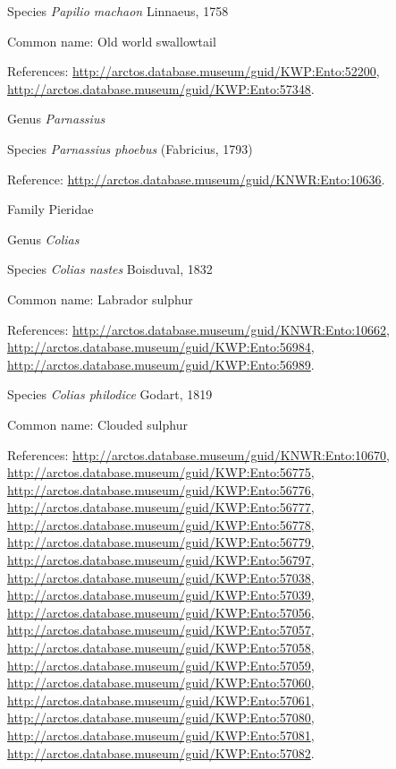 \documentclass[9pt, article]{memoir}
\begin{document}
\begin{multicols}{2}
\vspace{6pt}\noindent\hspace{36pt}Species \textit{Papilio machaon} Linnaeus, 1758


Common name: Old world swallowtail

References: 
\url{http://arctos.database.museum/guid/KWP:Ento:52200}, 
\url{http://arctos.database.museum/guid/KWP:Ento:57348}.

\vspace{6pt}\noindent\hspace{30pt}Genus \textit{Parnassius}


\vspace{6pt}\noindent\hspace{36pt}Species \textit{Parnassius phoebus} (Fabricius, 1793)


Reference: 
\url{http://arctos.database.museum/guid/KNWR:Ento:10636}.

\vspace{6pt}\noindent\hspace{24pt}Family Pieridae


\vspace{6pt}\noindent\hspace{30pt}Genus \textit{Colias}


\vspace{6pt}\noindent\hspace{36pt}Species \textit{Colias nastes} Boisduval, 1832


Common name: Labrador sulphur

References: 
\url{http://arctos.database.museum/guid/KNWR:Ento:10662}, 
\url{http://arctos.database.museum/guid/KWP:Ento:56984}, 
\url{http://arctos.database.museum/guid/KWP:Ento:56989}.

\vspace{6pt}\noindent\hspace{36pt}Species \textit{Colias philodice} Godart, 1819


Common name: Clouded sulphur

References: 
\url{http://arctos.database.museum/guid/KNWR:Ento:10670}, 
\url{http://arctos.database.museum/guid/KWP:Ento:56775}, 
\url{http://arctos.database.museum/guid/KWP:Ento:56776}, 
\url{http://arctos.database.museum/guid/KWP:Ento:56777}, 
\url{http://arctos.database.museum/guid/KWP:Ento:56778}, 
\url{http://arctos.database.museum/guid/KWP:Ento:56779}, 
\url{http://arctos.database.museum/guid/KWP:Ento:56797}, 
\url{http://arctos.database.museum/guid/KWP:Ento:57038}, 
\url{http://arctos.database.museum/guid/KWP:Ento:57039}, 
\url{http://arctos.database.museum/guid/KWP:Ento:57056}, 
\url{http://arctos.database.museum/guid/KWP:Ento:57057}, 
\url{http://arctos.database.museum/guid/KWP:Ento:57058}, 
\url{http://arctos.database.museum/guid/KWP:Ento:57059}, 
\url{http://arctos.database.museum/guid/KWP:Ento:57060}, 
\url{http://arctos.database.museum/guid/KWP:Ento:57061}, 
\url{http://arctos.database.museum/guid/KWP:Ento:57080}, 
\url{http://arctos.database.museum/guid/KWP:Ento:57081}, 
\url{http://arctos.database.museum/guid/KWP:Ento:57082}.


\end{multicols}
\end{document}

